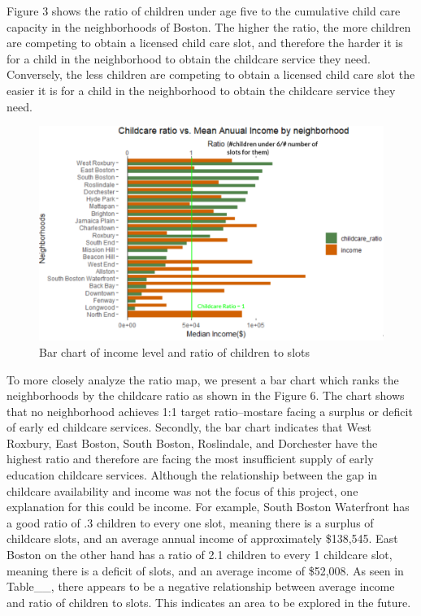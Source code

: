 \documentclass[10pt,letterpaper]{article}
\begin{document}
Figure 3 shows the ratio of children under age five to the cumulative
child care capacity in the neighborhoods of Boston. The higher the
ratio, the more children are competing to obtain a licensed child care
slot, and therefore the harder it is for a child in the neighborhood to
obtain the childcare service they need. Conversely, the less children
are competing to obtain a licensed child care slot the easier it is for
a child in the neighborhood to obtain the childcare service they need.

\begin{figure}

{\centering \includegraphics[width=1\linewidth]{income} 

}

\caption{Bar chart of income level and ratio of children to slots}\label{fig:unnamed-chunk-8}
\end{figure}

To more closely analyze the ratio map, we present a bar chart which
ranks the neighborhoods by the childcare ratio as shown in the Figure 6.
The chart shows that no neighborhood achieves 1:1 target ratio--mostare
facing a surplus or deficit of early ed childcare services. Secondly,
the bar chart indicates that West Roxbury, East Boston, South Boston,
Roslindale, and Dorchester have the highest ratio and therefore are
facing the most insufficient supply of early education childcare
services. Although the relationship between the gap in childcare
availability and income was not the focus of this project, one
explanation for this could be income. For example, South Boston
Waterfront has a good ratio of .3 children to every one slot, meaning
there is a surplus of childcare slots, and an average annual income of
approximately \$138,545. East Boston on the other hand has a ratio of
2.1 children to every 1 childcare slot, meaning there is a deficit of
slots, and an average income of \$52,008. As seen in Table\_\_, there
appears to be a negative relationship between average income and ratio
of children to slots. This indicates an area to be explored in the
future.
\end{document}
